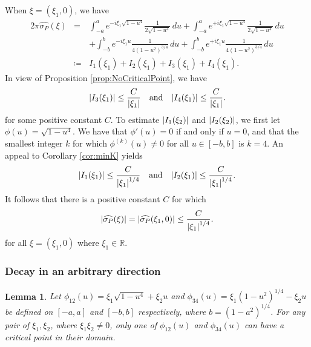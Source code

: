 \documentclass[11pt]{article}
\newtheorem{lemma}[theorem]{Lemma}
\newcommand{\f}[2]{\frac{#1}{#2}}
\begin{document}
When $\xi = (\xi_1,0)$, we have
\begin{eqnarray*}
    2\pi \widehat{\sigma_P}(\xi) 
    &=& \int_{-a}^a  e^{-i \xi_1 \sqrt{1-u^4}} \f{1}{2\sqrt{1-u^4}}\,du  + \int_{-a}^a  e^{+i \xi_1 \sqrt{1-u^4}} \f{1}{2\sqrt{1-u^4}}\,du \\
    &\quad& + \int_{-b}^b e^{-i \xi_1 u}  \f{1}{4(1 - u^2)^{3/4}} \,du + \int_{-b}^b e^{+i \xi_1 u} \f{1}{4(1 - u^2)^{3/4}}\,du \\
    &\coloneqq& I_1(\xi_1) + I_2(\xi_1) + I_3(\xi_1) + I_4(\xi_1).
\end{eqnarray*}
In view of Proposition \ref{prop:NoCriticalPoint}, we have
\begin{equation*}
    \abs{I_3(\xi_1)} \leq \f{C}{\abs{\xi_1}} \quad \mbox{and} \quad \abs{I_4(\xi_1)} \leq \f{C}{\abs{\xi_1}}.
\end{equation*}
for some positive constant $C$. To estimate $\abs{I_1(\xi_2)}$ and $\abs{I_2(\xi_2)}$, we first let $\phi(u) = \sqrt{1-u^4}$. We have that $\phi'(u) = 0$ if and only if $u=0$, and that the smallest integer $k$ for which $\phi^{(k)}(u) \neq 0$ for all $u\in [-b,b]$ is $k=4$. An appeal to Corollary \ref{cor:minK} yields
\begin{equation*}
    \abs{I_1(\xi_1)} \leq \f{C}{\abs{\xi_1}^{1/4}} \quad \mbox{and} \quad \abs{I_2(\xi_1)} \leq \f{C}{\abs{\xi_1}^{1/4}}.
\end{equation*}
It follows that there is a positive constant $C$ for which
\begin{equation*}
    \abs{\widehat{\sigma_P}(\xi)}= \abs{\widehat{\sigma_P}(\xi_1,0) } \leq \f{C}{\abs{\xi_1}^{1/4}}.
\end{equation*}
for all $\xi=(\xi_1,0)$ where $\xi_1\in\mathbb{R}$.







\subsubsection{Decay in an arbitrary direction}


\begin{lemma}\label{lem:critical}
Let $\phi_{12}(u) = \xi_1 \sqrt{1-u^4} + \xi_2 u $ and $\phi_{34}(u) = \xi_1 (1-u^2)^{1/4} - \xi_2 u$ be defined on $[-a,a]$ and $[-b,b]$ respectively, where $b = (1-a^2)^{1/4}$. For any pair of $\xi_1, \xi_2$, where $\xi_1 \xi_2 \neq 0$, only one of $\phi_{12}(u)$ and $\phi_{34}(u)$ can have a critical point in their domain. 
\end{lemma}
\end{document}
